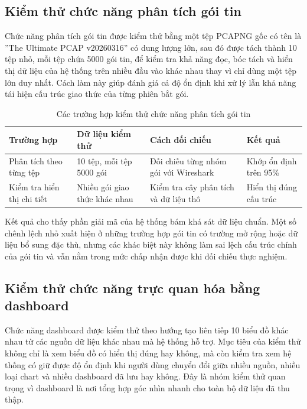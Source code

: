\documentclass[../DoAn.tex]{subfiles}
\begin{document}
\subsection{Kiểm thử chức năng phân tích gói tin}
Chức năng phân tích gói tin được kiểm thử bằng một tệp PCAPNG gốc có tên là ''The Ultimate PCAP v20260316'' có dung lượng lớn, sau đó được tách thành 10 tệp nhỏ, mỗi tệp chứa 5000 gói tin, để kiểm tra khả năng đọc, bóc tách và hiển thị dữ liệu của hệ thống trên nhiều đầu vào khác nhau thay vì chỉ dùng một tệp lớn duy nhất. Cách làm này giúp đánh giá cả độ ổn định khi xử lý lẫn khả năng tái hiện cấu trúc giao thức của từng phiên bắt gói.

\begin{table}[H]
\centering
\begin{tabular}{p{3.0cm}p{4.0cm}p{3.8cm}p{2.8cm}}
\hline
\textbf{Trường hợp} & \textbf{Dữ liệu kiểm thử} & \textbf{Cách đối chiếu} & \textbf{Kết quả} \\ \hline
Phân tích theo từng tệp & 10 tệp, mỗi tệp 5000 gói & Đối chiếu từng nhóm gói với Wireshark & Khớp ổn định trên 95\% \\ \hline
Kiểm tra hiển thị chi tiết & Nhiều gói giao thức khác nhau & Kiểm tra cây phân tích và dữ liệu thô & Hiển thị đúng cấu trúc \\ \hline
\end{tabular}
\caption{Các trường hợp kiểm thử chức năng phân tích gói tin}
\label{tab:test_packet_analysis}
\end{table}

Kết quả cho thấy phần giải mã của hệ thống bám khá sát dữ liệu chuẩn. Một số chênh lệch nhỏ xuất hiện ở những trường hợp gói tin có trường mở rộng hoặc dữ liệu bổ sung đặc thù, nhưng các khác biệt này không làm sai lệch cấu trúc chính của gói tin và vẫn nằm trong mức chấp nhận được khi đối chiếu thực nghiệm.

\subsection{Kiểm thử chức năng trực quan hóa bằng dashboard}
Chức năng dashboard được kiểm thử theo hướng tạo liên tiếp 10 biểu đồ khác nhau từ các nguồn dữ liệu khác nhau mà hệ thống hỗ trợ. Mục tiêu của kiểm thử không chỉ là xem biểu đồ có hiển thị đúng hay không, mà còn kiểm tra xem hệ thống có giữ được độ ổn định khi người dùng chuyển đổi giữa nhiều nguồn, nhiều loại chart và nhiều dashboard đã lưu hay không. Đây là nhóm kiểm thử quan trọng vì dashboard là nơi tổng hợp góc nhìn nhanh cho toàn bộ dữ liệu đã thu thập.
\end{document}
